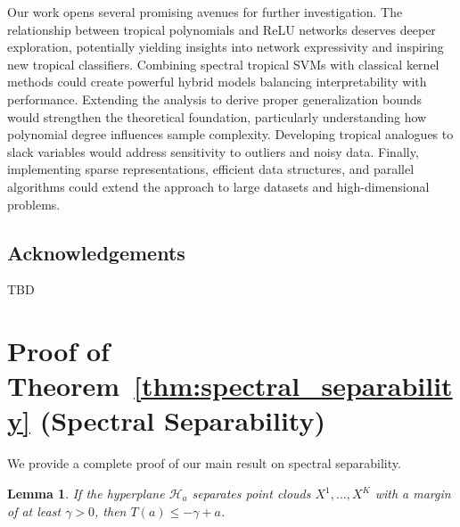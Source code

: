 \documentclass{article}
\newtheorem{lemma}[theorem]{Lemma}
\begin{document}
Our work opens several promising avenues for further investigation. The relationship between tropical polynomials and ReLU networks deserves deeper exploration, potentially yielding insights into network expressivity and inspiring new tropical classifiers. Combining spectral tropical SVMs with classical kernel methods could create powerful hybrid models balancing interpretability with performance. Extending the analysis to derive proper generalization bounds would strengthen the theoretical foundation, particularly understanding how polynomial degree influences sample complexity. Developing tropical analogues to slack variables would address sensitivity to outliers and noisy data. Finally, implementing sparse representations, efficient data structures, and parallel algorithms could extend the approach to large datasets and high-dimensional problems.

\subsection*{Acknowledgements}

TBD




\newpage
\appendix
\section{Proof of Theorem~\ref{thm:spectral_separability} (Spectral Separability)}\label{appendix:proofs}
We provide a complete proof of our main result on spectral separability.

\begin{lemma}\label{lemma:hyperplane_to_operator}
If the hyperplane $\mathcal{H}_a$ separates point clouds $X^1,\ldots,X^K$ with a margin of at least $\gamma > 0$, then $T(a) \leq -\gamma + a$.
\end{lemma}
\end{document}
